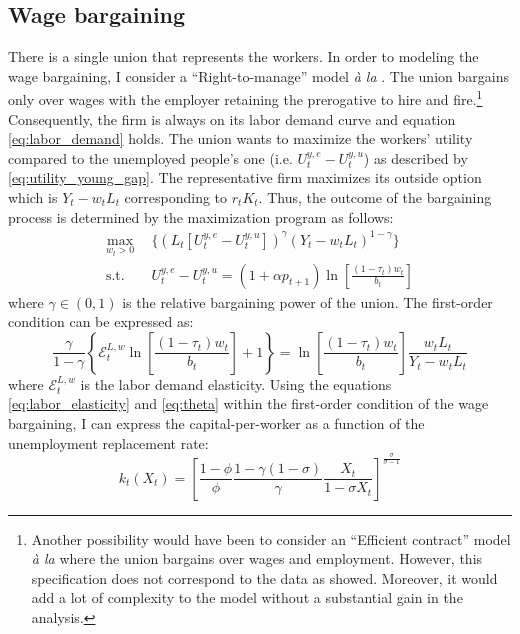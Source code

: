 \subsection{Wage bargaining}\label{subsec:wage_bargaining}

There is a single union that represents the workers. In order to modeling the wage bargaining, I consider a ``Right-to-manage'' model \textit{à la} \cite{Nickell1983}. The union bargains only over wages with the employer retaining the prerogative to hire and fire.\footnote{Another possibility would have been to consider an ``Efficient contract'' model \textit{à la} \cite{McDonald1981} where the union bargains over wages and employment. However, this specification does not correspond to the data as \cite{Bentolila2003} showed. Moreover, it would add a lot of complexity to the model without a substantial gain in the analysis.} Consequently, the firm is always on its labor demand curve and equation \eqref{eq:labor_demand} holds. The union wants to maximize the workers' utility compared to the unemployed people's one (i.e. $U^{y,e}_t - U^{y,u}_t$) as described by \eqref{eq:utility_young_gap}. The representative firm maximizes its outside option which is $Y_t-w_tL_t$ corresponding to $r_t K_t$. Thus, the outcome of the bargaining process is determined by the maximization program as follows:
	\begin{align*}
	\max_{w_t>0} ~~ &\lbrace \left(L_t[U^{y,e}_t - U^{y,u}_t]\right)^\gamma \left(Y_t-w_tL_t\right)^{1-\gamma}\rbrace\\
	\text{s.t.} ~~ &U_t^{y,e} - U_t^{y,u} = (1+\alpha p_{t+1})\ln\left[\frac{(1-\tau_t)w_t}{b_t}\right]
	\end{align*}
where $\gamma\in(0,1)$ is the relative bargaining power of the union. The first-order condition can be expressed as:
	\begin{equation*}\label{eq:foc_wage_bargaining}
	\frac{\gamma}{1-\gamma}\left\lbrace\mathcal{E}^{L,w}_t\ln\left[\frac{(1-\tau_t)w_t}{b_t}\right]+1\right\rbrace = \ln\left[\frac{(1-\tau_t)w_t}{b_t}\right] \frac{w_tL_t}{Y_t-w_tL_t}
	\end{equation*}
where $\mathcal{E}^{L,w}_t$ is the labor demand elasticity. Using the equations \eqref{eq:labor_elasticity} and \eqref{eq:theta} within the first-order condition of the wage bargaining, I can express the capital-per-worker as a function of the unemployment replacement rate:
	\begin{equation}\label{eq:k(x)}
	k_t(X_t) = \left[\frac{1-\phi}{\phi}\frac{1-\gamma(1-\sigma)}{\gamma}\frac{X_t}{1-\sigma X_t}\right]^{\frac{\sigma}{\sigma-1}}
	\end{equation}
